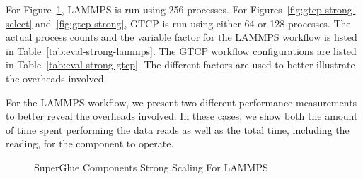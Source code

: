 \documentclass[conference]{IEEEtran}
\begin{document}
For Figure~\ref{fig:lammps-strong}, LAMMPS is run using 256 processes.  For
Figures~\ref{fig:gtcp-strong-select} and~\ref{fig:gtcp-strong}, GTCP is run
using either 64 or 128 processes. The actual process counts and the variable
factor for the LAMMPS workflow is listed in Table~\ref{tab:eval-strong-lammps}.
The GTCP workflow configurations are listed in
Table~\ref{tab:eval-strong-gtcp}.  The different factors are used to better
illustrate the overheads involved.

For the LAMMPS workflow, we present two different performance measurements to
better reveal the overheads involved. In these cases, we show both the amount
of time spent performing the data reads as well as the total time, including
the reading, for the component to operate.

\begin{figure}[t!]
\vspace{-0.10in}
\center
{}
\vspace{-0.10in}
\caption{SuperGlue Components Strong Scaling For LAMMPS}
\label{fig:lammps-strong}
\vspace{-0.10in}
\end{figure}
\end{document}

